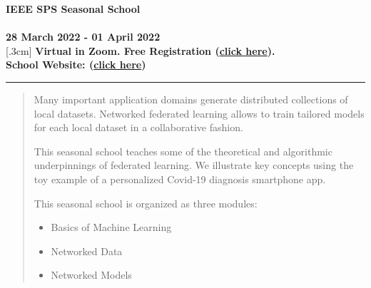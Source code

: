 \documentclass[12pt,epsf]{article}
\begin{document}
	\vspace*{10mm}

\begin{framed}
\begin{center}
\Large{\bf IEEE SPS Seasonal School}\\[.7cm]
		\\[.7cm]
\large{\bf 28 March 2022 - 01 April 2022}\\ 
[.3cm]
{\bf Virtual in Zoom. Free Registration (\href{https://events.vtools.ieee.org/event/register/297208}{click here}). }\\ [.3cm]
{\bf School Website: (\href{https://ieeespcasfinland.github.io/}{click here})} \\
\rule{10cm}{.3mm} \vspace*{-0cm}
\end{center}

\renewcommand{\baselinestretch}{.95}\small\normalsize
\vspace*{-15mm}
\large
\begin{quote}
{\bf
\noindent 

Many important application domains generate 
distributed collections of local datasets. Networked federated learning allows to train tailored models 
for each local dataset in a collaborative fashion. 

This seasonal school teaches some of the theoretical and algorithmic underpinnings of 
federated learning. We illustrate key concepts using the toy example of a personalized Covid-19 
diagnosis smartphone app. 

This seasonal school is organized as three modules: 
\begin{itemize}
	\item Basics of Machine Learning  
	\item Networked Data 
	\item Networked Models 
\end{itemize} 

}
\end{quote}
\end{framed}
\end{document}
